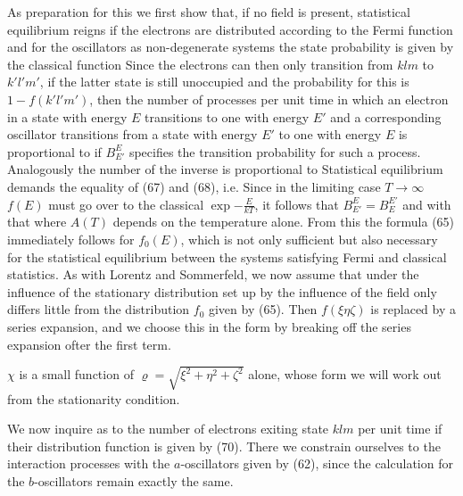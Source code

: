 \begin{paper}{1}
As preparation for this we first show that, if no field is present, statistical equilibrium reigns if the electrons are distributed according to the Fermi function
and for the oscillators as non-degenerate systems the state probability is given by the classical function
Since the electrons can then only transition from $klm$ to $k'l'm'$, if the latter state is still unoccupied and the probability for this is $1-f(k'l'm')$, then the number of processes per unit time in which an electron in a state with energy $E$ transitions to one with energy $E'$ and a corresponding oscillator transitions from a state with energy $E'$ to one with energy $E$ is proportional to
if $B_{E'}^E$ specifies the transition probability for such a process. Analogously the number of the inverse is proportional to
Statistical equilibrium demands the equality of (67) and (68), i.e.
Since in the limiting case $T\to\infty$ $f(E)$ must go over to the classical $\exp{-\frac{E}{kT}}$, it follows that $B_{E'}^E = B_E^{E'}$ and with that
where $A(T)$ depends on the temperature alone. From this the formula (65)  immediately follows for $f_0(E)$, which is not only sufficient but also necessary for the statistical equilibrium between the systems satisfying Fermi and classical statistics. As with Lorentz and Sommerfeld, we now assume that under the influence of the stationary distribution set up by the influence of the field only differs little from the distribution $f_0$ given by (65). Then $f(\xi\eta\zeta)$ is replaced by a series expansion, and we choose this in the form
by breaking off the series expansion ofter the first term. 

$\chi$ is a small function of $\varrho=\sqrt{\xi^2+\eta^2+\zeta^2}$ alone, whose form we will work out from the stationarity condition.

We now inquire as to the number of electrons exiting state $klm$ per unit time if their distribution function is given by (70). There we constrain ourselves to the interaction processes with the $a$-oscillators given by (62), since the calculation for the $b$-oscillators remain exactly the same.


\end{paper}
